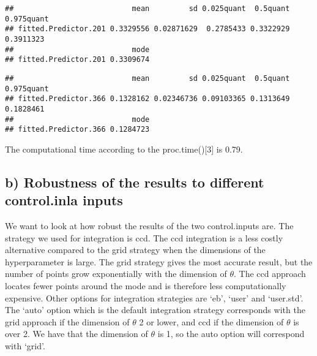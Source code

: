 \documentclass[
]{article}
\newenvironment{Shaded}{\begin{snugshade}}{\end{snugshade}}
\newcommand{\DecValTok}[1]{\textcolor[rgb]{0.00,0.00,0.81}{#1}}
\newcommand{\NormalTok}[1]{#1}
\newcommand{\SpecialCharTok}[1]{\textcolor[rgb]{0.00,0.00,0.00}{#1}}
\begin{document}
\begin{Shaded}
\end{Shaded}

\begin{verbatim}
##                           mean         sd 0.025quant  0.5quant 0.975quant
## fitted.Predictor.201 0.3329556 0.02871629  0.2785433 0.3322929  0.3911323
##                           mode
## fitted.Predictor.201 0.3309674
\end{verbatim}

\begin{Shaded}
\end{Shaded}

\begin{verbatim}
##                           mean         sd 0.025quant  0.5quant 0.975quant
## fitted.Predictor.366 0.1328162 0.02346736 0.09103365 0.1313649  0.1828461
##                           mode
## fitted.Predictor.366 0.1284723
\end{verbatim}

The computational time according to the proc.time(){[}3{]} is 0.79.

\hypertarget{b-robustness-of-the-results-to-different-control.inla-inputs}{%
\subsection{b) Robustness of the results to different control.inla inputs}\label{b-robustness-of-the-results-to-different-control.inla-inputs}}

We want to look at how robust the results of the two control.inputs are. The strategy we used for integration is ccd. The ccd integration is a less costly alternative compared to the grid strategy when the dimensions of the hyperparameter is large. The grid strategy gives the most accurate result, but the number of points grow exponentially with the dimension of \(\theta.\) The ccd approach locates fewer points around the mode and is therefore less computationally expensive. Other options for integration strategies are `eb', `user' and `user.std'. The `auto' option which is the default integration strategy corresponds with the grid approach if the dimension of \(\theta\) 2 or lower, and ccd if the dimension of \(\theta\) is over 2. We have that the dimension of \(\theta\) is 1, so the auto option will correspond with `grid'.
\end{document}
